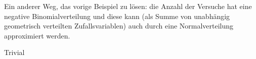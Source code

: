 \begin{exercise}

Ein anderer Weg, das vorige Beispiel zu lösen: die Anzahl der Versuche hat eine negative Binomialverteilung und diese kann (als Summe von unabhängig geometrisch verteilten Zufallsvariablen) auch durch eine Normalverteilung approximiert werden.

\end{exercise}

\begin{solution}

Trivial

\end{solution}
